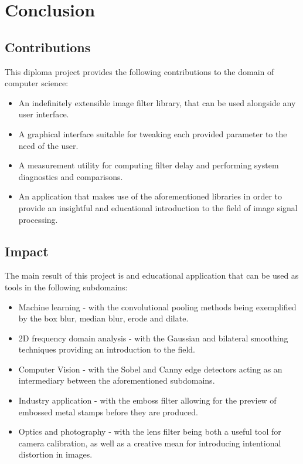 \chapter{Conclusion}

\section{Contributions}

This diploma project provides the following contributions to the domain of computer science:
\begin{itemize}
	\item An indefinitely extensible image filter library, that can be used alongside any user interface.
	\item A graphical interface suitable for tweaking each provided parameter to the need of the user.
	\item A measurement utility for computing filter delay and performing system diagnostics and comparisons.
	\item An application that makes use of the aforementioned libraries in order to provide an insightful and
	      educational introduction to the field of image signal processing.
\end{itemize}

\section{Impact}

The main result of this project is and educational application that can be used as tools in the following
subdomains:
\begin{itemize}
	\item Machine learning - with the convolutional pooling methods being exemplified by the box blur, median
	      blur, erode and dilate.
	\item 2D frequency domain analysis - with the Gaussian and bilateral smoothing techniques providing an
	      introduction to the field.
	\item Computer Vision - with the Sobel and Canny edge detectors acting as an intermediary between the
	      aforementioned subdomains.
	\item Industry application - with the emboss filter allowing for the preview of embossed metal stamps
	      before they are produced.
	\item Optics and photography - with the lens filter being both a useful tool for camera calibration, as
	      well as a creative mean for introducing intentional distortion in images.
\end{itemize}



